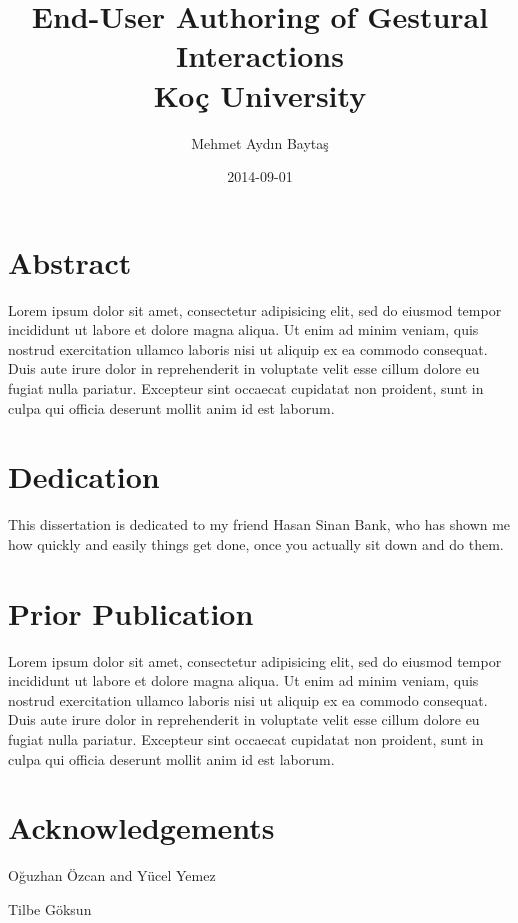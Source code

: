 \documentclass[10pt,twoside]{book}
\begin{document}
\title{
	{End-User Authoring of Gestural Interactions}\\
	{\large Koç University}
}
\author{Mehmet Aydın Baytaş}
\date{2014-09-01}

\maketitle

\chapter*{Abstract}

Lorem ipsum dolor sit amet, consectetur adipisicing elit, sed do eiusmod tempor incididunt ut labore et dolore magna aliqua. Ut enim ad minim veniam, quis nostrud exercitation ullamco laboris nisi ut aliquip ex ea commodo consequat. Duis aute irure dolor in reprehenderit in voluptate velit esse cillum dolore eu fugiat nulla pariatur. Excepteur sint occaecat cupidatat non proident, sunt in culpa qui officia deserunt mollit anim id est laborum.

\chapter*{Dedication}

This dissertation is dedicated to my friend Hasan Sinan Bank, who has shown me how quickly and easily things get done, once you actually sit down and do them.

\chapter*{Prior Publication}

Lorem ipsum dolor sit amet, consectetur adipisicing elit, sed do eiusmod tempor incididunt ut labore et dolore magna aliqua. Ut enim ad minim veniam, quis nostrud exercitation ullamco laboris nisi ut aliquip ex ea commodo consequat. Duis aute irure dolor in reprehenderit in voluptate velit esse cillum dolore eu fugiat nulla pariatur. Excepteur sint occaecat cupidatat non proident, sunt in culpa qui officia deserunt mollit anim id est laborum.

\chapter*{Acknowledgements}

Oğuzhan Özcan and Yücel Yemez

Tilbe Göksun
\end{document}

